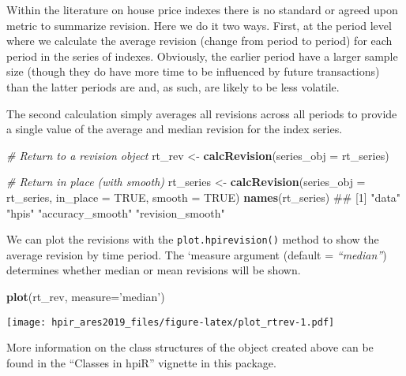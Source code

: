 \documentclass[]{article}
\newenvironment{Shaded}{\begin{snugshade}}{\end{snugshade}}
\newcommand{\KeywordTok}[1]{\textcolor[rgb]{0.13,0.29,0.53}{\textbf{#1}}}
\newcommand{\DataTypeTok}[1]{\textcolor[rgb]{0.13,0.29,0.53}{#1}}
\newcommand{\StringTok}[1]{\textcolor[rgb]{0.31,0.60,0.02}{#1}}
\newcommand{\CommentTok}[1]{\textcolor[rgb]{0.56,0.35,0.01}{\textit{#1}}}
\newcommand{\OtherTok}[1]{\textcolor[rgb]{0.56,0.35,0.01}{#1}}
\newcommand{\NormalTok}[1]{#1}
\begin{document}
Within the literature on house price indexes there is no standard or
agreed upon metric to summarize revision. Here we do it two ways. First,
at the period level where we calculate the average revision (change from
period to period) for each period in the series of indexes. Obviously,
the earlier period have a larger sample size (though they do have more
time to be influenced by future transactions) than the latter periods
are and, as such, are likely to be less volatile.

The second calculation simply averages all revisions across all periods
to provide a single value of the average and median revision for the
index series.

\begin{Shaded}
\begin{Highlighting}[]

  \CommentTok{# Return to a revision object}
\NormalTok{  rt_rev <-}\StringTok{ }\KeywordTok{calcRevision}\NormalTok{(}\DataTypeTok{series_obj =}\NormalTok{ rt_series)}

  \CommentTok{# Return in place (with smooth)}
\NormalTok{  rt_series <-}\StringTok{ }\KeywordTok{calcRevision}\NormalTok{(}\DataTypeTok{series_obj =}\NormalTok{ rt_series,}
                            \DataTypeTok{in_place =} \OtherTok{TRUE}\NormalTok{,}
                            \DataTypeTok{smooth =} \OtherTok{TRUE}\NormalTok{)}
  \KeywordTok{names}\NormalTok{(rt_series)}
\NormalTok{## [1] "data"            "hpis"            "accuracy_smooth" "revision_smooth"}
\end{Highlighting}
\end{Shaded}

We can plot the revisions with the \texttt{plot.hpirevision()} method to
show the average revision by time period. The `measure argument (default
= \emph{``median''}) determines whether median or mean revisions will be
shown.

\begin{Shaded}
\begin{Highlighting}[]
  \KeywordTok{plot}\NormalTok{(rt_rev, }\DataTypeTok{measure=}\StringTok{'median'}\NormalTok{)}
\end{Highlighting}
\end{Shaded}

\texttt{[image: hpir\_ares2019\_files/figure-latex/plot\_rtrev-1.pdf]}

More information on the class structures of the object created above can
be found in the ``Classes in hpiR'' vignette in this package.
\end{document}
